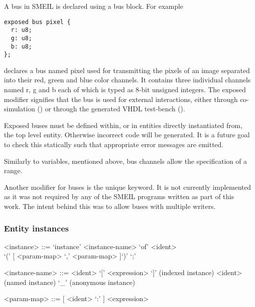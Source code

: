 A bus in SMEIL is declared using a {\ttfamily bus} block. For example
\begin{lstlisting}[language=smeil]
exposed bus pixel {
  r: u8;
  g: u8;
  b: u8;
};
\end{lstlisting}
declares a bus named {\ttfamily pixel} used for transmitting the pixels of an
image separated into their red, green and blue color channels. It contains three
individual channels named {\ttfamily r}, {\ttfamily g} and {\ttfamily b} each of
which is typed as 8-bit unsigned integers. The {\ttfamily exposed} modifier
signifies that the bus is used for external interactions, either through
co-simulation () or through the generated VHDL test-bench
().

Exposed buses must be defined within, or in entities directly instantiated from,
the top level entity. Otherwise incorrect code will be generated. It is a future
goal to check this statically such that appropriate error messages are emitted.

Similarly to variables, mentioned above, bus channels allow the specification of
a {\ttfamily range}.

Another modifier for buses is the {\ttfamily unique} keyword. It is not
currently implemented as it was not required by any of the SMEIL programs
written as part of this work. The intent behind this was to allow buses with
multiple writers. 



\subsubsection{Entity instances}
\label{sec:instance}
\begin{grammar}
  <instance> ::= `instance' <instance-name> `of' <ident> \\`(' [ <param-map> { `,' <param-map> } ]`)' `;'

  <instance-name> ::= <ident> `[' <expression> `]' (indexed instance)
  \alt <ident> (named instance)
  \alt `_' (anonymous instance)

  <param-map> ::= [ <ident> `:' ] <expression>

\end{grammar}

